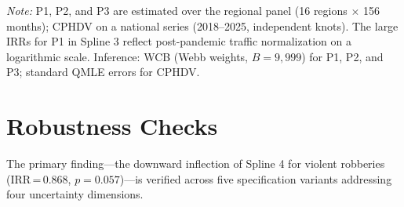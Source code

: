 \documentclass[pdflatex,sn-basic]{sn-jnl}
\newcommand{\tablenote}[1]{%
  \vspace{2pt}%
  {\par\footnotesize\textit{Note:} #1\par}%
}
\begin{document}
\begin{table}[htbp]
\centering
\caption{Placebos and external validation: Poisson-QMLE models}
\label{tab:placebos}
\footnotesize
{}
\tablenote{P1, P2, and P3 are estimated over the regional panel (16 regions $\times$ 156 months); CPHDV on a national series (2018--2025, independent knots). The large IRRs for P1 in Spline 3 reflect post-pandemic traffic normalization on a logarithmic scale. Inference: WCB (Webb weights, $B=9,999$) for P1, P2, and P3; standard QMLE errors for CPHDV.}
\end{table}

\section{Robustness Checks}
\label{sec:robustez}

The primary finding---the downward inflection of Spline 4 for violent robberies (IRR\,=\,0.868, $p=0.057$)---is verified across five specification variants addressing four uncertainty dimensions.
\end{document}
